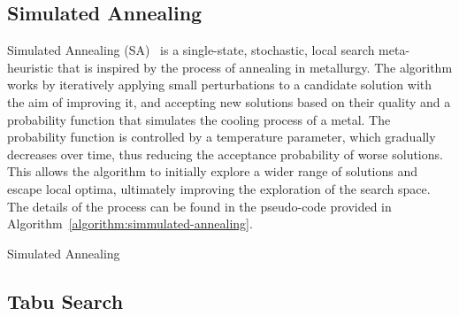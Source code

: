 \subsection{Simulated Annealing}

Simulated Annealing
(SA)~\cite{kirkpatrick1983optimization,nikolaev2010simulateda,
  luke2013essentialsa,blummetaheuristics} is a single-state, stochastic, local
search meta-heuristic that is inspired by the process of annealing in
metallurgy.  The algorithm works by iteratively applying small perturbations to
a candidate solution with the aim of improving it, and accepting new solutions
based on their quality and a probability function that simulates the cooling
process of a metal. The probability function is controlled by a temperature
parameter, which gradually decreases over time, thus reducing the acceptance
probability of worse solutions. This allows the algorithm to initially explore a
wider range of solutions and escape local optima, ultimately improving the
exploration of the search space. The details of the process can be found in the
pseudo-code provided in Algorithm~\ref{algorithm:simmulated-annealing}.

\begin{algorithm}[htb!]
  \DontPrintSemicolon
  \caption{Simulated Annealing}
  \label{algorithm:simmulated-annealing}
\end{algorithm}

\subsection{Tabu Search}

